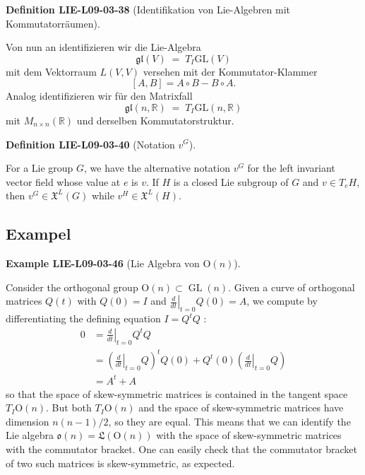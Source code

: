\documentclass[10pt, letterpaper]{article}
\newcommand{\Ogroup}{\mathrm{O}} %
\newcommand{\CustomHeading}[3]{%
  \par\medskip\noindent%
  \textbf{#1 #2} \textnormal{(#3)}.\enskip%
}
\newenvironment{DEF}[2]{\CustomHeading{Definition}{#1}{#2}}{}
\newenvironment{EXA}[2]{\CustomHeading{Example}{#1}{#2}}{}
\begin{document}
\begin{DEF}{LIE-L09-03-38}{Identifikation von Lie-Algebren mit Kommutatorräumen}
Von nun an identifizieren wir die Lie-Algebra
\[
\mathfrak{gl}(V)\;=\;T_I \mathrm{GL}(V)
\]
mit dem Vektorraum $L(V,V)$ versehen mit der Kommutator-Klammer
\[
[A,B]=A\circ B - B\circ A.
\]
Analog identifizieren wir für den Matrixfall
\[
\mathfrak{gl}(n,\mathbb{R})\;=\;T_I \mathrm{GL}(n,\mathbb{R})
\]
mit $M_{n\times n}(\mathbb{R})$ und derselben Kommutatorstruktur.
\end{DEF}

\begin{DEF}{LIE-L09-03-40}{Notation $v^G$}
For a Lie group $G$, we have the alternative notation $v^{G}$ for the left invariant vector field whose value at $e$ is $v$. If $H$ is a closed Lie subgroup of $G$ and $v \in T_{e} H$, then $v^{G} \in \mathfrak{X}^{L}(G)$ while $v^{H} \in \mathfrak{X}^{L}(H)$.
\end{DEF}

\subsection{Exampel}

\begin{EXA}{LIE-L09-03-46}{Lie Algebra von $\Ogroup(n)$}
Consider the orthogonal group $\mathrm{O}(n) \subset \operatorname{GL}(n)$. Given a curve of orthogonal matrices $Q(t)$ with $Q(0)=I$ and $\left.\frac{d}{d t}\right|_{t=0} Q(0)=A$, we compute by differentiating the defining equation $I=Q^{t} Q$ :
$$
\begin{aligned}
0 & =\left.\frac{d}{d t}\right|_{t=0} Q^{t} Q \\
& =\left(\left.\frac{d}{d t}\right|_{t=0} Q\right)^{t} Q(0)+Q^{t}(0)\left(\left.\frac{d}{d t}\right|_{t=0} Q\right) \\
& =A^{t}+A
\end{aligned}
$$
so that the space of skew-symmetric matrices is contained in the tangent space $T_{I} \mathrm{O}(n)$. But both $T_{I} \mathrm{O}(n)$ and the space of skew-symmetric matrices have dimension $n(n-1) / 2$, so they are equal. This means that we can identify the Lie algebra $\mathfrak{o}(n)=\mathfrak{L}(\mathrm{O}(n))$ with the space of skew-symmetric matrices with the commutator bracket. One can easily check that the commutator bracket of two such matrices is skew-symmetric, as expected.
\end{EXA}
\end{document}
